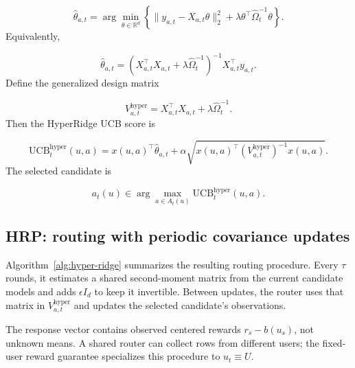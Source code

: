 \documentclass{article} %
\begin{document}
\begin{equation}
\widehat{\theta}_{a,t}
= \arg\min_{\theta \in \mathbb{R}^d}
\left\{ \| y_{a,t} - X_{a,t}\theta \|_2^2
      + \lambda \theta^\top \widehat{\Omega}_t^{-1} \theta \right\}.
\end{equation}
Equivalently,

\begin{equation}
\label{eq:hyper-theta-hat}
\widehat{\theta}_{a,t}
= \left( X_{a,t}^\top X_{a,t} + \lambda \widehat{\Omega}_t^{-1} \right)^{-1}
  X_{a,t}^\top y_{a,t}.
\end{equation}
Define the generalized design matrix

\begin{equation}
\label{eq:hyper-design}
V_{a,t}^{\mathrm{hyper}} = X_{a,t}^\top X_{a,t} + \lambda \widehat{\Omega}_t^{-1}.
\end{equation}
Then the HyperRidge UCB score is

\begin{equation}
\label{eq:hyper-ucb}
\mathrm{UCB}_t^{\mathrm{hyper}}(u, a)
= x(u, a)^\top \widehat{\theta}_{a,t}
+ \alpha \sqrt{ x(u, a)^\top \left( V_{a,t}^{\mathrm{hyper}} \right)^{-1} x(u, a) }.
\end{equation}
The selected candidate is

\begin{equation}
a_t(u) \in \arg\max_{a \in A_t(u)} \mathrm{UCB}_t^{\mathrm{hyper}}(u, a).
\end{equation}
\subsection{HRP: routing with periodic covariance updates}

\label{sec:method-alg}

Algorithm~\ref{alg:hyper-ridge} summarizes the resulting routing procedure.
Every $\tau$ rounds, it estimates a shared second-moment matrix from the
current candidate models and adds $\epsilon I_d$ to keep it invertible.
Between updates, the router uses that matrix in
$V_{a,t}^{\mathrm{hyper}}$ and updates the selected candidate's observations.

The response vector contains observed centered rewards $r_s-b(u_s)$, not
unknown means. A shared router can collect rows from different users;
the fixed-user reward guarantee specializes this procedure to $u_t\equiv U$.
\end{document}
